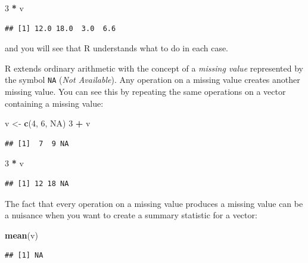 \documentclass[
]{book}
\newenvironment{Shaded}{\begin{snugshade}}{\end{snugshade}}
\newcommand{\ConstantTok}[1]{\textcolor[rgb]{0.56,0.35,0.01}{#1}}
\newcommand{\DecValTok}[1]{\textcolor[rgb]{0.00,0.00,0.81}{#1}}
\newcommand{\FunctionTok}[1]{\textcolor[rgb]{0.13,0.29,0.53}{\textbf{#1}}}
\newcommand{\NormalTok}[1]{#1}
\newcommand{\OtherTok}[1]{\textcolor[rgb]{0.56,0.35,0.01}{#1}}
\newcommand{\SpecialCharTok}[1]{\textcolor[rgb]{0.81,0.36,0.00}{\textbf{#1}}}
\theoremstyle{definition}
\theoremstyle{definition}
\theoremstyle{definition}
\theoremstyle{definition}
\theoremstyle{remark}
\begin{document}
\begin{Shaded}
\begin{Highlighting}[]
\DecValTok{3} \SpecialCharTok{*}\NormalTok{ v}
\end{Highlighting}
\end{Shaded}

\begin{verbatim}
## [1] 12.0 18.0  3.0  6.6
\end{verbatim}

and you will see that R understands what to do in each case.

R extends ordinary arithmetic with the concept of a \emph{missing value}
represented by the symbol \texttt{NA} (\emph{Not Available}). Any
operation on a missing value creates another missing value. You can
see this by repeating the same operations on a vector containing a
missing value:

\begin{Shaded}
\begin{Highlighting}[]
\NormalTok{v }\OtherTok{\textless{}{-}} \FunctionTok{c}\NormalTok{(}\DecValTok{4}\NormalTok{, }\DecValTok{6}\NormalTok{, }\ConstantTok{NA}\NormalTok{)}
\DecValTok{3} \SpecialCharTok{+}\NormalTok{ v}
\end{Highlighting}
\end{Shaded}

\begin{verbatim}
## [1]  7  9 NA
\end{verbatim}

\begin{Shaded}
\begin{Highlighting}[]
\DecValTok{3} \SpecialCharTok{*}\NormalTok{ v}
\end{Highlighting}
\end{Shaded}

\begin{verbatim}
## [1] 12 18 NA
\end{verbatim}

The fact that every operation on a missing value produces a missing value
can be a nuisance when you want to create a summary statistic for a vector:

\begin{Shaded}
\begin{Highlighting}[]
\FunctionTok{mean}\NormalTok{(v)}
\end{Highlighting}
\end{Shaded}

\begin{verbatim}
## [1] NA
\end{verbatim}
\end{document}
